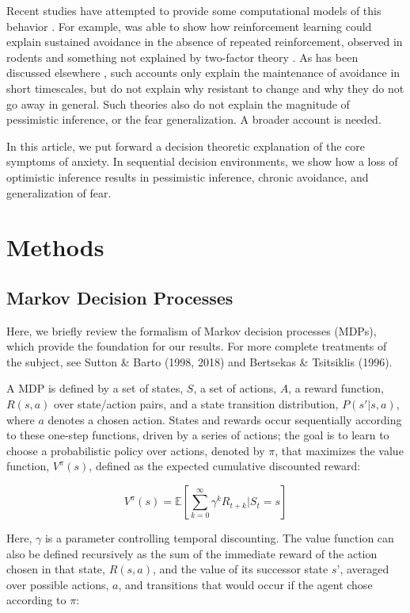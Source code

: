 \documentclass[11pt]{article} %
\begin{document}
Recent studies have attempted to provide some computational models of this behavior
\citep{Moutoussis2008, Maia2010}. For example, \citep{Maia2010} was able to show
how reinforcement learning could explain sustained avoidance in the absence of
repeated reinforcement, observed in rodents \citep{servatius2008} and something
not explained by two-factor theory \citep{Krypotos2015}. As has been discussed
elsewhere \citep{Moutoussis2017}, such accounts only explain the maintenance of
avoidance in short timescales, but do not explain why resistant to change and
why they do not go away in general. Such theories also do not explain the magnitude
of pessimistic inference, or the fear generalization. A broader account is needed.

In this article, we put forward a decision theoretic explanation of the core
symptoms of anxiety. In sequential decision environments, we show how a loss of
optimistic inference results in pessimistic inference, chronic avoidance, and
generalization of fear.

\section{Methods}

\subsection{Markov Decision Processes}

Here, we briefly review the formalism of Markov decision processes (MDPs), which
provide the foundation for our results. For more complete treatments of the
subject, see Sutton \& Barto (1998, 2018) and Bertsekas \& Tsitsiklis (1996).

A MDP is defined by a set of states, $S$, a set of actions, $A$, a reward
function, $R(s,a)$ over state/action pairs, and a state transition distribution,
$P(s'|s,a)$, where $a$ denotes a chosen action. States and rewards occur
sequentially according to these one-step functions, driven by a series of
actions; the goal is to learn to choose a probabilistic policy over actions,
denoted by $\pi$, that maximizes the value function, $V^\pi(s)$, defined as the
expected cumulative discounted reward:

$$ V^\pi(s) = \mathbb{E} \left[ \sum^{\infty}_{k=0} \gamma^k R_{t+k} | S_t = s \right] $$

Here, $\gamma$ is a parameter controlling temporal discounting. The value function
can also be defined recursively as the sum of the immediate reward of the action
chosen in that state, $R(s, a)$, and the value of its successor state $s’$,
averaged over possible actions, $a$, and transitions that would occur if the agent
chose according to $\pi$:
\end{document}
